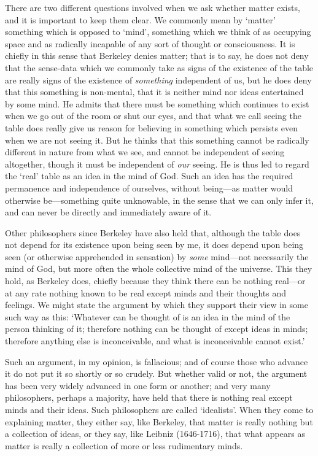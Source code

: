 \documentclass[oneside,letterpaper,12pt]{book}
\begin{document}
There are two different questions involved when we ask whether matter
exists, and it is important to keep them clear. We commonly mean by
`matter' something which is opposed to
`mind', something which we think of as
occupying space and as radically incapable of any sort of thought or
consciousness. It is chiefly in this sense that Berkeley denies matter;
that is to say, he does not deny that the sense-data which we commonly
take as signs of the existence of the table are really signs of the
existence of \emph{something} independent of us, but he does deny that
this something is non-mental, that it is neither mind nor ideas
entertained by some mind. He admits that there must be something which
continues to exist when we go out of the room or shut our eyes, and that
what we call seeing the table does really give us reason for believing
in something which persists even when we are not seeing it. But he
thinks that this something cannot be radically different in nature from
what we see, and cannot be independent of seeing altogether, though it
must be independent of \emph{our} seeing. He is thus led to regard the
`real' table as an idea in the mind of
God. Such an idea has the required permanence and independence of
ourselves, without being---as matter would otherwise be---something
quite unknowable, in the sense that we can only infer it, and can never
be directly and immediately aware of it.

Other philosophers since Berkeley have also held that, although the
table does not depend for its existence upon being seen by me, it does
depend upon being seen (or otherwise apprehended in sensation) by
\emph{some} mind---not necessarily the mind of God, but more often the
whole collective mind of the universe. This they hold, as Berkeley does,
chiefly because they think there can be nothing real---or at any rate
nothing known to be real except minds and their thoughts and feelings.
We might state the argument by which they support their view in some
such way as this: `Whatever can be thought of is an idea
in the mind of the person thinking of it; therefore nothing can be
thought of except ideas in minds; therefore anything else is
inconceivable, and what is inconceivable cannot exist.'

Such an argument, in my opinion, is fallacious; and of course those who
advance it do not put it so shortly or so crudely. But whether valid or
not, the argument has been very widely advanced in one form or another;
and very many philosophers, perhaps a majority, have held that there is
nothing real except minds and their ideas. Such philosophers are called
`idealists'. When they come to explaining
matter, they either say, like Berkeley, that matter is really nothing
but a collection of ideas, or they say, like Leibniz (1646-1716), that
what appears as matter is really a collection of more or less
rudimentary minds.
\end{document}
